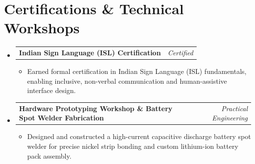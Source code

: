 \documentclass[letterpaper,10pt]{article}
\makeatletter
\newcommand{\resumeProjectHeading}[2]{
  \vspace{-2pt}\item
    \begin{tabular*}{\linewidth}[t]{l@{\extracolsep{\fill}}r}
      \textbf{#1} & \textit{\small #2} \\
    \end{tabular*}\vspace{-3pt}
}
\newcommand{\resumeSubHeadingListStart}{\begin{itemize}[leftmargin=*]}
\newcommand{\resumeSubHeadingListEnd}{\end{itemize}}
\newcommand{\resumeItemListStart}{\begin{itemize}[leftmargin=14pt, labelsep=4pt, itemsep=0.5pt, parsep=0pt]}
\newcommand{\resumeItemListEnd}{\end{itemize}\vspace{-3pt}}
\makeatother
\begin{document}
\section{Certifications \& Technical Workshops}
  \resumeSubHeadingListStart
    \resumeProjectHeading
      {Indian Sign Language (ISL) Certification}{Certified}
      \resumeItemListStart
        \item{Earned formal certification in Indian Sign Language (ISL) fundamentals, enabling inclusive, non-verbal communication and human-assistive interface design.}
      \resumeItemListEnd

    \resumeProjectHeading
      {Hardware Prototyping Workshop \& Battery Spot Welder Fabrication}{Practical Engineering}
      \resumeItemListStart
        \item{Designed and constructed a high-current capacitive discharge battery spot welder for precise nickel strip bonding and custom lithium-ion battery pack assembly.}
      \resumeItemListEnd
  \resumeSubHeadingListEnd
\end{document}
